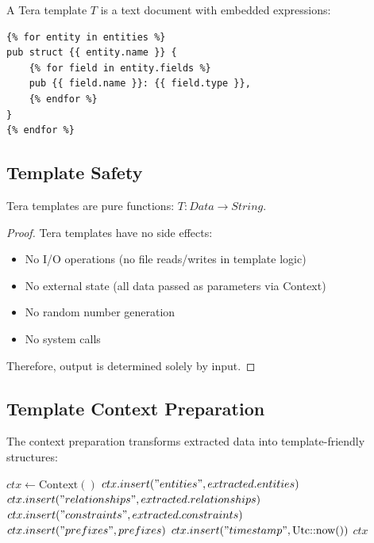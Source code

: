 \begin{definition}
    A Tera template \(T\) is a text document with embedded expressions:
    \begin{verbatim}
{% for entity in entities %}
pub struct {{ entity.name }} {
    {% for field in entity.fields %}
    pub {{ field.name }}: {{ field.type }},
    {% endfor %}
}
{% endfor %}
    \end{verbatim}
\end{definition}

\subsection{Template Safety}

\begin{theorem}
    Tera templates are pure functions: \(T: Data \rightarrow String\).
\end{theorem}

\begin{proof}
    Tera templates have no side effects:
    \begin{itemize}
        \item No I/O operations (no file reads/writes in template logic)
        \item No external state (all data passed as parameters via Context)
        \item No random number generation
        \item No system calls
    \end{itemize}
    Therefore, output is determined solely by input.
\end{proof}

\subsection{Template Context Preparation}

The context preparation transforms extracted data into template-friendly structures:

\begin{algorithm}
\caption{Context Preparation}
\begin{algorithmic}[1]
    \State $ctx \gets \text{Context}()$
    \State $ctx.insert("entities", extracted.entities)$
    \State $ctx.insert("relationships", extracted.relationships)$
    \State $ctx.insert("constraints", extracted.constraints)$
    \State $ctx.insert("prefixes", prefixes)$
    \State $ctx.insert("timestamp", \text{Utc::now()})$
    \State \Return $ctx$
\EndProcedure
\end{algorithmic}
\end{algorithm}

